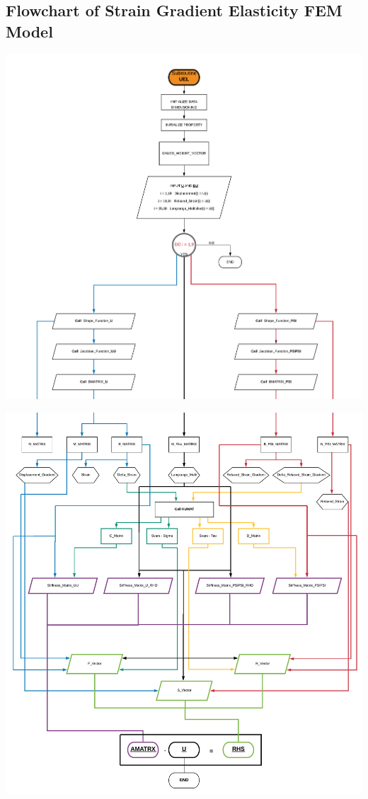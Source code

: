 \documentclass[12pt]{article}
\begin{document}
\begin{appendices}
\section{Flowchart of Strain Gradient Elasticity FEM Model}
\vspace{5cm}
\includegraphics[scale=0.60,page=1]{flow_chart_1.pdf}
\newpage
\begin{center}
	\includegraphics[scale=0.60,page=1]{flow_chart_2.pdf}
\end{center}
\newpage

\end{appendices}
\end{document}
